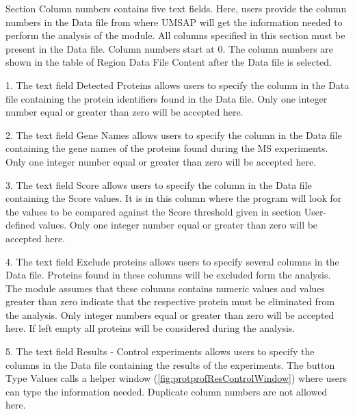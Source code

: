Section Column numbers contains five text fields. Here, users provide the column
numbers in the Data file from where UMSAP will get the information needed to perform
the analysis of the module. All columns specified in this section must be present
in the Data file. Column numbers start at \num{0}. The column numbers are shown in
the table of Region Data File Content after the Data file is selected.

\num{1}. The text field Detected Proteins allows users to specify the column in
the Data file containing the protein identifiers found in the Data file. Only one
integer number equal or greater than zero will be accepted here. 

\num{2}. The text field Gene Names allows users to specify the column in the Data
file containing the gene names of the proteins found during the MS experiments.
Only one integer number equal or greater than zero will be accepted here. 

\num{3}. The text field Score allows users to specify the column in the Data file
containing the Score values. It is in this column where the program will look for
the values to be compared against the Score threshold given in section User-defined
values. Only one integer number equal or greater than zero will be accepted here. 

\num{4}. The text field Exclude proteins allows users to specify several columns
in the Data file. Proteins found in these columns will be excluded form the analysis.
The module assumes that these columns contains numeric values and values greater
than zero indicate that the respective protein must be eliminated from the analysis.
Only integer numbers equal or greater than zero will be accepted here. If left empty
all proteins will be considered during the analysis. 

\num{5}. \label{par:protprofResultControl} The text field Results - Control experiments
allows users to specify the columns in the Data file containing the results of the
experiments. The button Type Values calls a helper window (\autoref{fig:protprofResControlWindow})
where users can type the information needed. Duplicate column numbers are not allowed here.

